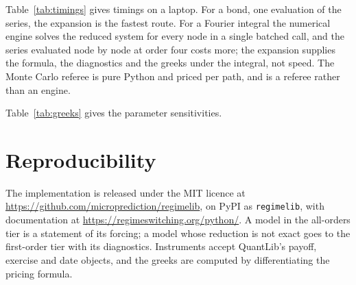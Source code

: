 \documentclass[11pt]{article}
\theoremstyle{remark}
\newcommand{\eps}{\varepsilon}
\newcommand{\ql}{\textsf{QuantLib}}
\begin{document}
Table~\ref{tab:timings} gives timings on a laptop. For a bond, one evaluation of the series, the expansion is
the fastest route. For a Fourier integral the numerical engine solves the reduced system for every node in a
single batched call, and the series evaluated node by node at order four costs more; the expansion supplies the
formula, the diagnostics and the greeks under the integral, not speed. The Monte Carlo referee is pure Python
and priced per path, and is a referee rather than an engine.

Table~\ref{tab:greeks} gives the parameter sensitivities.

\begin{table}[t]\centering\footnotesize
\resizebox{\textwidth}{!}{}
\caption{Frozen limit: two identical regimes on a chain with rates 3 and 5 per year, against \ql{}. Grid engines
(American, Bermudan, barrier) carry the grid's discretisation error; the characteristic-function engines agree to
quadrature accuracy.}
\label{tab:frozen}
\end{table}

\begin{table}[t]\centering\small

\caption{Relative error of the expansion at each order against the numerical solution of the reduced system, for
a $2\times5$ payer swaption under a two-regime Vasicek model, by mean holding time $\eps$ of a symmetric two-state
chain.}
\label{tab:orders}
\end{table}

\begin{table}[t]\centering\small

\caption{Wall-clock time per price with switching on (two regimes, rates 12 and 8), Python on a laptop.}
\label{tab:timings}
\end{table}

\begin{table}[t]\centering\small

\caption{Parameter sensitivities of the first-order Vasicek bond under a three-regime chain, from the derivative of the group inverse
and from central differences of the engine at order one.}
\label{tab:greeks}
\end{table}

\section{Reproducibility}
\label{sec:software}

The implementation is released under the MIT licence at \url{https://github.com/microprediction/regimelib}, on
PyPI as \texttt{regimelib}, with documentation at \url{https://regimeswitching.org/python/}. A model in the
all-orders tier is a statement of its forcing; a model whose reduction is not exact goes to the first-order tier
with its diagnostics. Instruments accept \ql{}'s payoff, exercise and date objects, and the greeks are computed by
differentiating the pricing formula.
\end{document}
